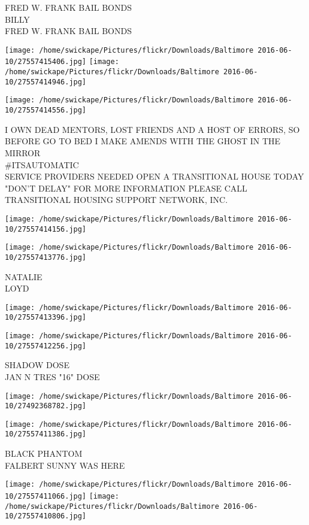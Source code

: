 \documentclass[10pt,letterpaper]{article}
\begin{document}
FRED W. FRANK BAIL BONDS\\
BILLY\\
FRED W. FRANK BAIL BONDS
\pagebreak

\texttt{[image: /home/swickape/Pictures/flickr/Downloads/Baltimore 2016-06-10/27557415406.jpg]}
\texttt{[image: /home/swickape/Pictures/flickr/Downloads/Baltimore 2016-06-10/27557414946.jpg]}

\vspace{0.25in}
\texttt{[image: /home/swickape/Pictures/flickr/Downloads/Baltimore 2016-06-10/27557414556.jpg]}

I OWN DEAD MENTORS, LOST FRIENDS AND A HOST OF ERRORS, SO BEFORE GO TO BED I MAKE AMENDS WITH THE GHOST IN THE MIRROR\\
\#ITSAUTOMATIC\\
SERVICE PROVIDERS NEEDED OPEN A TRANSITIONAL HOUSE TODAY "DON'T DELAY" FOR MORE INFORMATION PLEASE CALL TRANSITIONAL HOUSING SUPPORT NETWORK, INC.
\pagebreak

\texttt{[image: /home/swickape/Pictures/flickr/Downloads/Baltimore 2016-06-10/27557414156.jpg]}

\vspace{0.25in}
\texttt{[image: /home/swickape/Pictures/flickr/Downloads/Baltimore 2016-06-10/27557413776.jpg]}

NATALIE\\
LOYD
\pagebreak

\texttt{[image: /home/swickape/Pictures/flickr/Downloads/Baltimore 2016-06-10/27557413396.jpg]}

\vspace{0.25in}
\texttt{[image: /home/swickape/Pictures/flickr/Downloads/Baltimore 2016-06-10/27557412256.jpg]}

SHADOW DOSE\\
JAN N TRES "16" DOSE
\pagebreak

\texttt{[image: /home/swickape/Pictures/flickr/Downloads/Baltimore 2016-06-10/27492368782.jpg]}

\vspace{0.25in}
\texttt{[image: /home/swickape/Pictures/flickr/Downloads/Baltimore 2016-06-10/27557411386.jpg]}

BLACK PHANTOM\\
FALBERT SUNNY WAS HERE
\pagebreak

\texttt{[image: /home/swickape/Pictures/flickr/Downloads/Baltimore 2016-06-10/27557411066.jpg]}
\texttt{[image: /home/swickape/Pictures/flickr/Downloads/Baltimore 2016-06-10/27557410806.jpg]}
\end{document}
